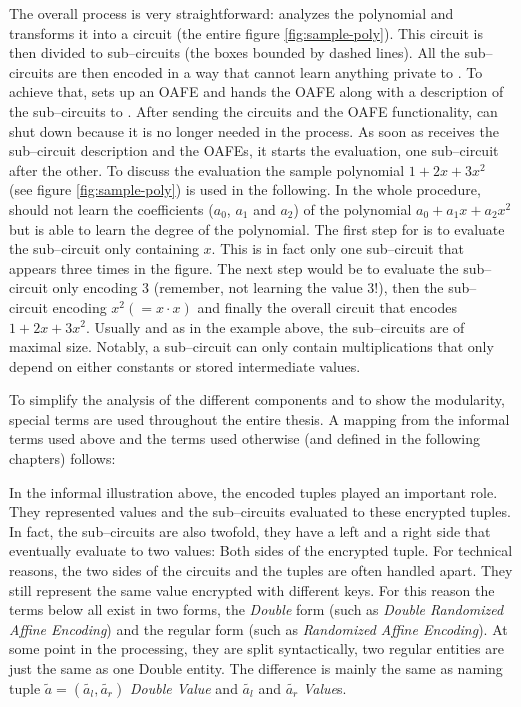 The overall process is very straightforward: \JWpOne{} analyzes the polynomial
and transforms it into a circuit (the entire figure \ref{fig:sample-poly}). This
circuit is then divided to sub--circuits (the boxes bounded by dashed lines).
All the sub--circuits are then encoded in a way that \JWpTwo{} cannot learn
anything private to \JWpOne{}. To achieve that, \JWpOne{} sets up an OAFE and
hands the OAFE along with a description of the sub--circuits to \JWpTwo{}.
After sending the circuits and the OAFE functionality, \JWpOne{} can shut down
because it is no longer needed in the process. As soon as \JWpTwo{} receives the
sub--circuit description and the OAFEs, it starts the evaluation, one
sub--circuit after the other. To discuss the evaluation the sample polynomial $1
+ 2x + 3x^2$ (see figure \ref{fig:sample-poly}) is used in the following. In the
whole procedure, \JWpTwo{} should not learn the coefficients ($a_0$, $a_1$ and
$a_2$) of the polynomial $a_0 + a_1x + a_2x^2$ but is able to learn the degree
of the polynomial. The first step for \JWpTwo{} is to evaluate the sub--circuit
only containing $x$.  This is in fact only one sub--circuit that appears three
times in the figure.  The next step would be to evaluate the sub--circuit only
encoding $3$ (remember, not learning the value $3$!), then the sub--circuit
encoding $x^2 (= x \cdot x)$ and finally the overall circuit that encodes $1 +
2x + 3x^2$.  Usually and as in the example above, the sub--circuits are of
maximal size. Notably, a sub--circuit can only contain multiplications that only
depend on either constants or stored intermediate values.

To simplify the analysis of the different components and to show the modularity,
special terms are used throughout the entire thesis. A mapping from the informal
terms used above and the terms used otherwise (and defined in the following
chapters) follows:

In the informal illustration above, the encoded tuples played an important role.
They represented values and the sub--circuits evaluated to these encrypted
tuples. In fact, the sub--circuits are also twofold, they have a left and a
right side that eventually evaluate to two values: Both sides of the encrypted
tuple. For technical reasons, the two sides of the circuits and the tuples are
often handled apart. They still represent the same value encrypted with
different keys. For this reason the terms below all exist in two forms, the
\emph{Double} form (such as \emph{Double Randomized Affine Encoding}) and the
regular form (such as \emph{Randomized Affine Encoding}). At some point in the
processing, they are split syntactically, two regular entities are just the same
as one Double entity. The difference is mainly the same as naming tuple
$\widetilde{a} = (\widetilde{a_l}, \widetilde{a_r})$ \emph{Double Value} and
$\widetilde{a_l}$ and $\widetilde{a_r}$ \emph{Value}s.

